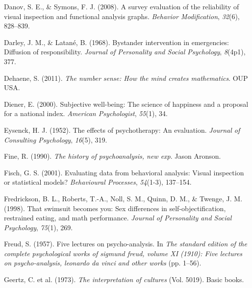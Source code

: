 \documentclass[
]{krantz}
\newlength{\cslhangindent}
\newlength{\cslentryspacingunit} %
\newenvironment{CSLReferences}[2] %
 {%
  \setlength{\parindent}{0pt}
  \ifodd #1
  \let\oldpar\par
  \def\par{\hangindent=\cslhangindent\oldpar}
  \fi
  \setlength{\parskip}{#2\cslentryspacingunit}
 }%
 {}
\begin{document}
\begin{CSLReferences}{1}{0}
\leavevmode{}%
Danov, S. E., \& Symons, F. J. (2008). A survey evaluation of the reliability of visual inspection and functional analysis graphs. \emph{Behavior Modification}, \emph{32}(6), 828--839.

\leavevmode{}%
Darley, J. M., \& Latané, B. (1968). Bystander intervention in emergencies: Diffusion of responsibility. \emph{Journal of Personality and Social Psychology}, \emph{8}(4p1), 377.

\leavevmode{}%
Dehaene, S. (2011). \emph{The number sense: How the mind creates mathematics}. OUP USA.

\leavevmode{}%
Diener, E. (2000). Subjective well-being: The science of happiness and a proposal for a national index. \emph{American Psychologist}, \emph{55}(1), 34.

\leavevmode{}%
Eysenck, H. J. (1952). The effects of psychotherapy: An evaluation. \emph{Journal of Consulting Psychology}, \emph{16}(5), 319.

\leavevmode{}%
Fine, R. (1990). \emph{The history of psychoanalysis, new exp}. Jason Aronson.

\leavevmode{}%
Fisch, G. S. (2001). Evaluating data from behavioral analysis: Visual inspection or statistical models? \emph{Behavioural Processes}, \emph{54}(1-3), 137--154.

\leavevmode{}%
Fredrickson, B. L., Roberts, T.-A., Noll, S. M., Quinn, D. M., \& Twenge, J. M. (1998). That swimsuit becomes you: Sex differences in self-objectification, restrained eating, and math performance. \emph{Journal of Personality and Social Psychology}, \emph{75}(1), 269.

\leavevmode{}%
Freud, S. (1957). Five lectures on psycho-analysis. In \emph{The standard edition of the complete psychological works of sigmund freud, volume XI (1910): Five lectures on psycho-analysis, leonardo da vinci and other works} (pp. 1--56).

\leavevmode{}%
Geertz, C. et al. (1973). \emph{The interpretation of cultures} (Vol. 5019). Basic books.


\end{CSLReferences}
\end{document}
